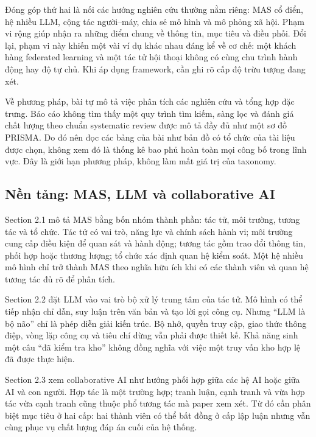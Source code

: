 Đóng góp thứ hai là nối các hướng nghiên cứu thường nằm riêng: MAS cổ
điển, hệ nhiều LLM, cộng tác người--máy, chia sẻ mô hình và mô phỏng xã
hội. Phạm vi rộng giúp nhận ra những điểm chung về thông tin, mục tiêu
và điều phối. Đổi lại, phạm vi này khiến một vài ví dụ khác nhau đáng kể
về cơ chế: một khách hàng federated learning và một tác tử hội thoại
không có cùng chu trình hành động hay độ tự chủ. Khi áp dụng framework,
cần ghi rõ cấp độ trừu tượng đang xét.

Về phương pháp, bài tự mô tả việc phân tích các nghiên cứu và tổng hợp
đặc trưng. Báo cáo không tìm thấy một quy trình tìm kiếm, sàng lọc và
đánh giá chất lượng theo chuẩn systematic review được mô tả đầy đủ như
một sơ đồ PRISMA. Do đó nên đọc các bảng của bài như bản đồ có tổ chức
của tài liệu được chọn, không xem đó là thống kê bao phủ hoàn toàn mọi
công bố trong lĩnh vực. Đây là giới hạn phương pháp, không làm mất giá
trị của taxonomy.

\subsection{Nền tảng: MAS, LLM và collaborative
AI}\label{nux1ec1n-tux1ea3ng-mas-llm-vuxe0-collaborative-ai}

Section 2.1 mô tả MAS bằng bốn nhóm thành phần: tác tử, môi trường,
tương tác và tổ chức. Tác tử có vai trò, năng lực và chính sách hành vi;
môi trường cung cấp điều kiện để quan sát và hành động; tương tác gồm
trao đổi thông tin, phối hợp hoặc thương lượng; tổ chức xác định quan hệ
kiểm soát. Một hệ nhiều mô hình chỉ trở thành MAS theo nghĩa hữu ích khi
có các thành viên và quan hệ tương tác đủ rõ để phân tích.

Section 2.2 đặt LLM vào vai trò bộ xử lý trung tâm của tác tử. Mô hình
có thể tiếp nhận chỉ dẫn, suy luận trên văn bản và tạo lời gọi công cụ.
Nhưng ``LLM là bộ não'' chỉ là phép diễn giải kiến trúc. Bộ nhớ, quyền
truy cập, giao thức thông điệp, vòng lặp công cụ và tiêu chí dừng vẫn
phải được thiết kế. Khả năng sinh một câu ``đã kiểm tra kho'' không đồng
nghĩa với việc một truy vấn kho hợp lệ đã được thực hiện.

Section 2.3 xem collaborative AI như hướng phối hợp giữa các hệ AI hoặc
giữa AI và con người. Hợp tác là một trường hợp; tranh luận, cạnh tranh
và vừa hợp tác vừa cạnh tranh cũng thuộc phổ tương tác mà paper xem xét.
Từ đó cần phân biệt mục tiêu ở hai cấp: hai thành viên có thể bất đồng ở
cấp lập luận nhưng vẫn cùng phục vụ chất lượng đáp án cuối của hệ thống.

